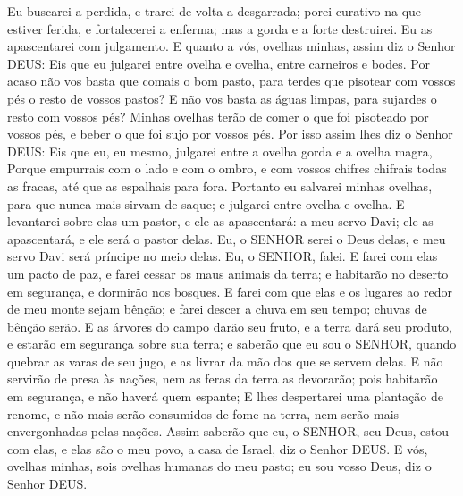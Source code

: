 {  Eu buscarei a perdida, e trarei de volta a desgarrada; porei curativo na que estiver ferida, e fortalecerei a enferma; mas a gorda e a forte destruirei. Eu as apascentarei com julgamento.
  E quanto a vós, ovelhas minhas, assim diz o Senhor DEUS: Eis que eu julgarei entre ovelha e ovelha, entre carneiros e bodes.
  Por acaso não vos basta que comais o bom pasto, para terdes que pisotear com vossos pés o resto de vossos pastos? E não vos basta as águas limpas, para sujardes o resto
{} com vossos pés?
  Minhas ovelhas terão de comer o que foi pisoteado por vossos pés, e beber o que foi sujo por vossos pés.
  Por isso assim lhes diz o Senhor DEUS: Eis que eu, eu mesmo, julgarei entre a ovelha gorda e a ovelha magra,
  Porque empurrais com o lado e com o ombro, e com vossos chifres chifrais todas as fracas, até que as espalhais para fora.
  Portanto eu salvarei minhas ovelhas, para que nunca mais sirvam de saque; e julgarei entre ovelha e ovelha.
  E levantarei sobre elas um pastor, e ele as apascentará: a meu servo Davi; ele as apascentará, e ele será o pastor delas.
  Eu, o SENHOR serei o Deus delas, e meu servo Davi será príncipe no meio delas. Eu, o SENHOR, falei.
  E farei com elas um pacto de paz, e farei cessar os maus animais da terra; e habitarão no deserto em segurança, e dormirão nos bosques.
  E farei com que elas e os lugares ao redor de meu monte sejam bênção; e farei descer a chuva em seu tempo; chuvas de bênção serão.
  E as árvores do campo darão seu fruto, e a terra dará seu produto, e estarão em segurança sobre sua terra; e saberão que eu sou o SENHOR, quando quebrar as varas de seu jugo, e as livrar da mão dos que se servem delas.
  E não
{} servirão de presa às nações, nem as feras da terra as devorarão; pois habitarão em segurança, e não haverá quem
{} espante;
  E lhes despertarei uma plantação de renome, e não mais serão consumidos de fome na terra, nem serão mais envergonhadas pelas nações.
  Assim saberão que eu, o SENHOR, seu Deus, estou com elas, e elas são o meu povo, a casa de Israel, diz o Senhor DEUS.
  E vós, ovelhas minhas, sois ovelhas humanas do meu pasto; eu sou vosso Deus, diz o Senhor DEUS.
\par }

